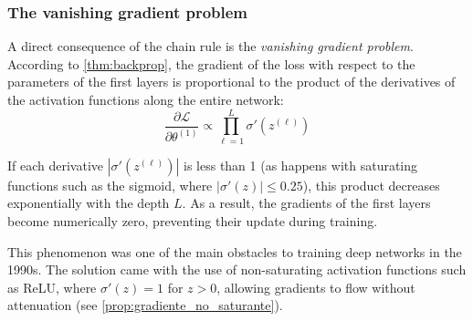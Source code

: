 \subsubsection{The vanishing gradient problem}\label{subsubsec:vanishing_gradient}

A direct consequence of the chain rule is the \textit{vanishing gradient problem}. According to \autoref{thm:backprop}, the gradient of the loss with respect to the parameters of the first layers is proportional to the product of the derivatives of the activation functions along the entire network:
\[
\frac{\partial \mathcal{L}}{\partial \theta^{(1)}} \propto \prod_{\ell=1}^{L} \sigma'(z^{(\ell)})
\]

If each derivative $|\sigma'(z^{(\ell)})|$ is less than 1 (as happens with saturating functions such as the sigmoid, where $|\sigma'(z)| \leq 0.25$), this product decreases exponentially with the depth $L$. As a result, the gradients of the first layers become numerically zero, preventing their update during training.

This phenomenon was one of the main obstacles to training deep networks in the 1990s. The solution came with the use of non-saturating activation functions such as \gls{ReLU}, where $\sigma'(z) = 1$ for $z > 0$, allowing gradients to flow without attenuation (see \autoref{prop:gradiente_no_saturante}).

